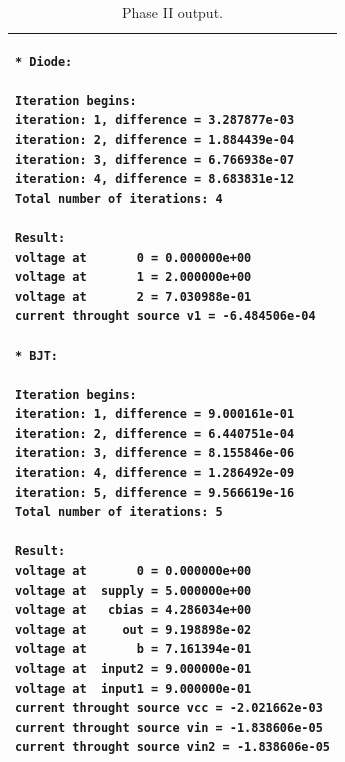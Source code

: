 \documentclass{article}
\begin{document}
\begin{table}[h]
  \centering
\begin{tabular}{|p{\linewidth}|}
\hline
\begin{verbatim}
* Diode:

Iteration begins:
iteration: 1, difference = 3.287877e-03
iteration: 2, difference = 1.884439e-04
iteration: 3, difference = 6.766938e-07
iteration: 4, difference = 8.683831e-12
Total number of iterations: 4

Result:
voltage at       0 = 0.000000e+00
voltage at       1 = 2.000000e+00
voltage at       2 = 7.030988e-01
current throught source v1 = -6.484506e-04

* BJT:

Iteration begins:
iteration: 1, difference = 9.000161e-01
iteration: 2, difference = 6.440751e-04
iteration: 3, difference = 8.155846e-06
iteration: 4, difference = 1.286492e-09
iteration: 5, difference = 9.566619e-16
Total number of iterations: 5

Result:
voltage at       0 = 0.000000e+00
voltage at  supply = 5.000000e+00
voltage at   cbias = 4.286034e+00
voltage at     out = 9.198898e-02
voltage at       b = 7.161394e-01
voltage at  input2 = 9.000000e-01
voltage at  input1 = 9.000000e-01
current throught source vcc = -2.021662e-03
current throught source vin = -1.838606e-05
current throught source vin2 = -1.838606e-05
\end{verbatim}\\
\hline
\end{tabular}
  \caption{Phase II output.}
  \label{tab:phase2}
\end{table}
\end{document}

